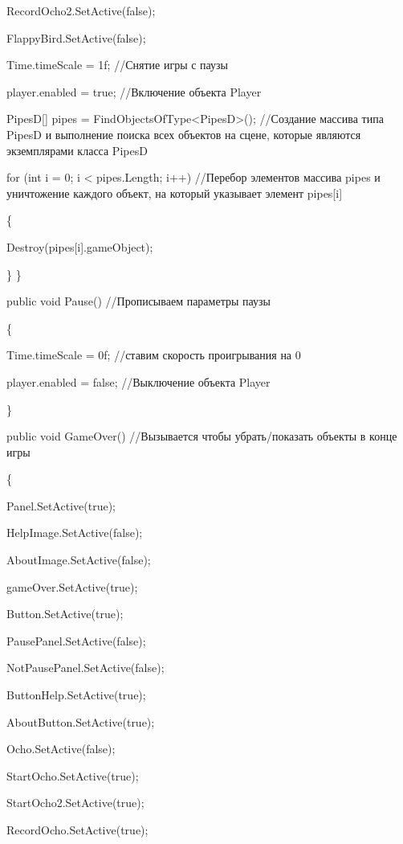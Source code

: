 \documentclass[14pt, oneside]{altsu-report}
\begin{document}
        RecordOcho2.SetActive(false);
        
        FlappyBird.SetActive(false);

        Time.timeScale = 1f; //Снятие игры с паузы
        
        player.enabled = true; //Включение объекта Player

        PipesD[] pipes = FindObjectsOfType<PipesD>(); //Создание массива типа PipesD и выполнение поиска всех объектов на сцене, которые являются экземплярами класса PipesD 

        for (int i = 0; i < pipes.Length; i++) //Перебор элементов массива pipes и уничтожение каждого объект, на который указывает элемент pipes[i]
        
        \{
        
            
            Destroy(pipes[i].gameObject);
        
        \}
    \}

    public void Pause() //Прописываем параметры паузы
    
    \{
    
        Time.timeScale = 0f; //ставим скорость проигрывания на 0
        
        player.enabled = false; //Выключение объекта Player
        
    \}

    public void GameOver() //Вызывается чтобы убрать/показать объекты в конце игры
    
    \{
    
        Panel.SetActive(true);
        
        HelpImage.SetActive(false);
        
        AboutImage.SetActive(false);
        
        gameOver.SetActive(true);
        
        Button.SetActive(true);

        PausePanel.SetActive(false);
        
        NotPausePanel.SetActive(false);

        ButtonHelp.SetActive(true);
        
        AboutButton.SetActive(true);

        Ocho.SetActive(false);
        
        StartOcho.SetActive(true);
        
        StartOcho2.SetActive(true);
        
        RecordOcho.SetActive(true);
        
\end{document}
